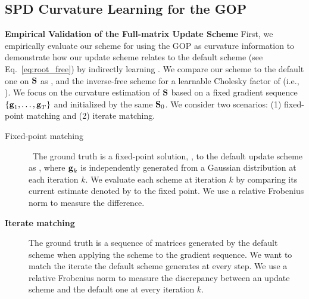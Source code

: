 


%


%


\vspace{-0.2cm}
\subsection{SPD Curvature Learning for the GOP}
\vspace{-0.15cm}
{\bf Empirical Validation of the Full-matrix Update Scheme}
First, we empirically evaluate our scheme for
using the GOP as curvature information to demonstrate how our update scheme relates to the default scheme (see Eq.~\eqref{eq:root_free}) by indirectly learning
.
We compare our scheme to the default one on $\mbox{$\mbox{$\mathbf{S}$}$}$ as
, and the inverse-free scheme \citep{lincan2024} for a learnable Cholesky factor \scalebox{0.8}{$\vC$} of  (i.e., ).
%
We focus on the curvature estimation of $\mbox{$\mbox{$\mathbf{S}$}$}$ based on a fixed gradient sequence $\{\mbox{$\mbox{$\mathbf{g}$}$}_1,\dots,\mbox{$\mbox{$\mathbf{g}$}$}_T\}$ and initialized by the same $\mbox{$\mbox{$\mathbf{S}$}$}_0$. 
We consider two scenarios:
(1) fixed-point matching and (2) iterate matching. 
%

\vspace{-0.3cm}
\begin{description}
 \item[Fixed-point matching]\,
 The ground truth  is a fixed-point solution, , to the default update scheme as , where
  $\mbox{$\mbox{$\mathbf{g}$}$}_k$ is independently generated from a Gaussian distribution  at each iteration $k$.
We evaluate each scheme at iteration $k$ by comparing its current estimate denoted by  to the fixed point.
We use a relative Frobenius norm 
to measure the difference.


\vspace{-0.2cm}
\item[\bf Iterate matching]
The ground truth is a sequence of matrices 
generated by the default scheme when applying the scheme to the gradient sequence.
We want to match the iterate the default scheme generates at every step. 
We use a relative Frobenius norm 
to measure the discrepancy between an update scheme and the default one at every iteration $k$.
\end{description}

